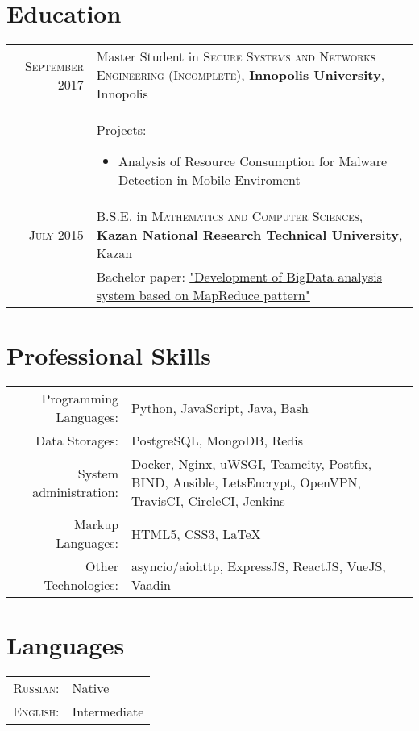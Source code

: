 \documentclass[a4paper,10pt]{article}
\begin{document}
\section{Education}
\begin{tabular}{r p{11cm}}
 \textsc{September} 2017 & Master Student in \textsc{Secure Systems and Networks Engineering (Incomplete)}, \textbf{Innopolis University}, Innopolis\\
 & Projects:
 \begin{itemize}
    \item Analysis of Resource Consumption for Malware Detection in Mobile Enviroment
 \end{itemize}\\
 \textsc{July} 2015 & B.S.E. in \textsc{Mathematics and Computer Sciences}, \textbf{Kazan National Research Technical University}, Kazan\\
 & Bachelor paper: \href{https://github.com/litleleprikon/bachelor\_paper}{"Development of BigData analysis system based on MapReduce pattern"}\\
\end{tabular}

\section{Professional Skills}
\begin{tabular}{r p{11cm}}

 Programming Languages:  &  Python, JavaScript, Java, Bash\\
 Data Storages:          &  PostgreSQL, MongoDB, Redis \\
 System administration:  &  Docker, Nginx, uWSGI, Teamcity, Postfix, BIND, Ansible, LetsEncrypt, OpenVPN, TravisCI, CircleCI, Jenkins\\
 Markup Languages:       &  HTML5, CSS3, \LaTeX \\
 Other Technologies:     &  asyncio/aiohttp, ExpressJS, ReactJS, VueJS, Vaadin

\end{tabular}

\section{Languages}
\begin{tabular}{r p{11cm}}
 \textsc{Russian:}&Native\\
\textsc{English:}&Intermediate\\
\end{tabular}

\end{document}
